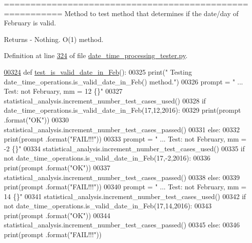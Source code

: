 ========================================================= Method to test method that determines if the date/day of February is valid. 

\begin{DoxyReturn}{Returns}
-\/ Nothing. O(1) method. 
\end{DoxyReturn}


Definition at line \hyperlink{date__time__processing__tester_8py_source_l00324}{324} of file \hyperlink{date__time__processing__tester_8py_source}{date\+\_\+time\+\_\+processing\+\_\+tester.\+py}.


\begin{DoxyCode}
\hypertarget{classutilities_1_1date__time__processing__tester_1_1date__time__operations__tester_l00324}{}\hyperlink{classutilities_1_1date__time__processing__tester_1_1date__time__operations__tester_a69aaf4f9d5369d9730be1c41980f6708}{00324}     \textcolor{keyword}{def }\hyperlink{classutilities_1_1date__time__processing__tester_1_1date__time__operations__tester_a69aaf4f9d5369d9730be1c41980f6708}{test\_is\_valid\_date\_in\_Feb}():
00325         print(\textcolor{stringliteral}{" Testing date\_time\_operations.is\_valid\_date\_in\_Feb() method."})
00326         prompt = \textcolor{stringliteral}{"  ... Test: not February, mm = 12             \{\}"}
00327         statistical\_analysis.increment\_number\_test\_cases\_used()
00328         \textcolor{keywordflow}{if} date\_time\_operations.is\_valid\_date\_in\_Feb(17,12,2016):
00329             print(prompt .format(\textcolor{stringliteral}{"OK"}))
00330             statistical\_analysis.increment\_number\_test\_cases\_passed()
00331         \textcolor{keywordflow}{else}:
00332             print(prompt .format(\textcolor{stringliteral}{"FAIL!!!"}))
00333         prompt = \textcolor{stringliteral}{"  ... Test: not February, mm = -2             \{\}"}
00334         statistical\_analysis.increment\_number\_test\_cases\_used()
00335         \textcolor{keywordflow}{if} \textcolor{keywordflow}{not} date\_time\_operations.is\_valid\_date\_in\_Feb(17,-2,2016):
00336             print(prompt .format(\textcolor{stringliteral}{"OK"}))
00337             statistical\_analysis.increment\_number\_test\_cases\_passed()
00338         \textcolor{keywordflow}{else}:
00339             print(prompt .format(\textcolor{stringliteral}{"FAIL!!!"}))
00340         prompt = \textcolor{stringliteral}{"  ... Test: not February, mm = 14             \{\}"}
00341         statistical\_analysis.increment\_number\_test\_cases\_used()
00342         \textcolor{keywordflow}{if} \textcolor{keywordflow}{not} date\_time\_operations.is\_valid\_date\_in\_Feb(17,14,2016):
00343             print(prompt .format(\textcolor{stringliteral}{"OK"}))
00344             statistical\_analysis.increment\_number\_test\_cases\_passed()
00345         \textcolor{keywordflow}{else}:
00346             print(prompt .format(\textcolor{stringliteral}{"FAIL!!!"}))
\end{DoxyCode}
